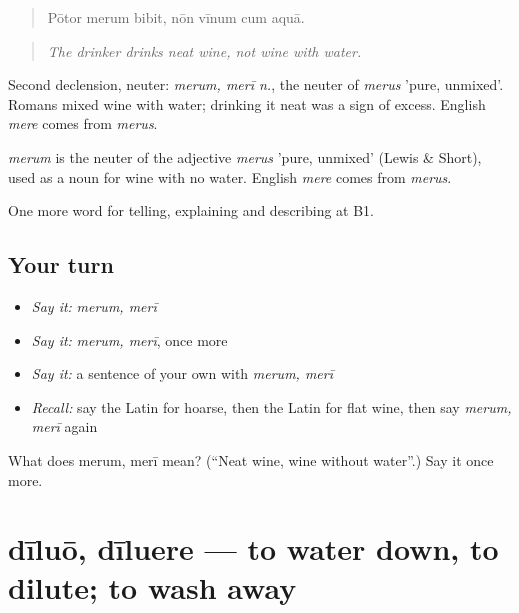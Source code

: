 \begin{quote}
Pōtor merum bibit, nōn vīnum cum aquā.
\end{quote}

\begin{quote}
\emph{The drinker drinks neat wine, not wine with water.}
\end{quote}

Second declension, neuter: \emph{merum, merī n.}, the neuter of \emph{merus} 'pure, unmixed'. Romans mixed wine with water; drinking it neat was a sign of excess. English \emph{mere} comes from \emph{merus}.

\begin{cousinweb}
\emph{merum} is the neuter of the adjective \emph{merus} 'pure, unmixed' (Lewis \& Short), used as a noun for wine with no water. English \emph{mere} comes from \emph{merus}.
\end{cousinweb}

\begin{grammarlens}[title={What you've built}]
One more word for telling, explaining and describing at B1.
\end{grammarlens}

\subsection*{Your turn}
\begin{itemize}
\raggedright
  \item \emph{Say it:} \emph{merum, merī}
  \item \emph{Say it:} \emph{merum, merī}, once more
  \item \emph{Say it:} a sentence of your own with \emph{merum, merī}
  \item \emph{Recall:} say the Latin for hoarse, then the Latin for flat wine, then say \emph{merum, merī} again
\end{itemize}

\begin{tcolorbox}[breakable,colback=teal!4,colframe=teal!35!black,title={Before you move on}]
What does merum, merī mean? (\textquotedblleft{}Neat wine, wine without water\textquotedblright{}.) Say it once more.
\end{tcolorbox}
\section[dīluō, dīluere]{dīluō, dīluere — to water down, to dilute; to wash away}

\label{lesson:LA-C449-diluo}




